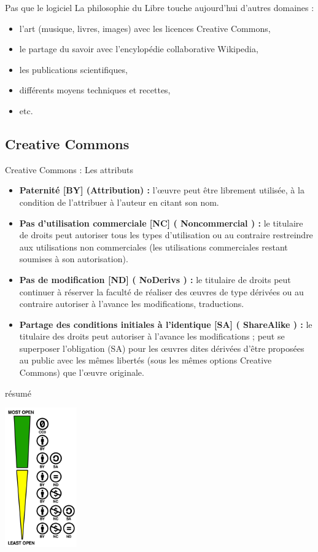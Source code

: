\documentclass[10pt]{beamer}
\begin{document}
\begin{frame}{Pas que le logiciel}
La philosophie du Libre touche aujourd’hui d’autres domaines :
	\begin{itemize}
		\item l’art (musique, livres, images) avec les licences Creative Commons,
		\item le partage du savoir avec l’encylopédie collaborative Wikipedia,
		\item les publications scientifiques,
		\item différents moyens techniques et recettes,
		\item etc.
	\end{itemize}
\end{frame}
\subsection{Creative Commons}
\begin{frame}{Creative Commons : Les attributs}
	\begin{itemize}
		\item \textbf{Paternité [BY] (Attribution) :} l'œuvre peut être librement utilisée, à la condition de l'attribuer à l'auteur en citant son nom. 
		\item \textbf{Pas d'utilisation commerciale [NC] ( Noncommercial ) :} le titulaire de droits peut autoriser tous les types d’utilisation ou au contraire restreindre aux utilisations non commerciales (les utilisations commerciales restant soumises à son autorisation). 
		\item \textbf{Pas de modification [ND] ( NoDerivs ) :} le titulaire de droits peut continuer à réserver la faculté de réaliser des œuvres de type dérivées ou au contraire autoriser à l'avance les modifications, traductions. 
		\item \textbf{Partage des conditions initiales à l'identique [SA] ( ShareAlike ) :} le titulaire des droits peut autoriser à l'avance les modifications ; peut se superposer l'obligation (SA) pour les œuvres dites dérivées d'être proposées au public avec les mêmes libertés (sous les mêmes options Creative Commons) que l'œuvre originale. 
	\end{itemize}
\end{frame}
\begin{frame}{résumé}
	\begin{center}	
		\includegraphics[height=6cm]{img/cc.png}
	\end{center}
\end{frame}
\end{document}
